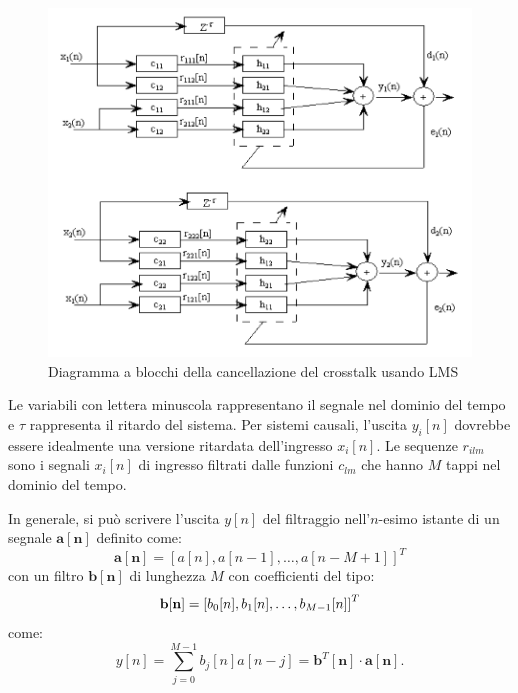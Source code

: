 \documentclass[12pt,a4paper,titlepage]{article}
\begin{document}
\begin{figure}[h]
	\centering	
	\includegraphics[width=\textwidth]{Immagini/lms.png}
	\caption{Diagramma a blocchi della cancellazione del crosstalk usando LMS}
	\label{fig:lms}
\end{figure}

Le variabili con lettera minuscola rappresentano il segnale nel dominio del tempo e $\tau$ rappresenta il ritardo del sistema. Per sistemi causali, l'uscita $y_i[n]$ dovrebbe essere idealmente una versione ritardata dell'ingresso $x_i[n]$. Le sequenze $r_{ilm}$ sono i segnali $x_i[n]$ di ingresso filtrati dalle funzioni $c_{lm}$ che hanno $M$ tappi nel dominio del tempo.

In generale, si può scrivere l'uscita $y[n]$ del filtraggio nell'$n$-esimo istante di un segnale $\mathbf{a[n]}$ definito come:
\begin{equation*}
\mathbf{a[n]} = \left[a[n], a[n-1], \dots, a[n - M + 1]\right]^T
\end{equation*}
con un filtro $\mathbf{b[n]}$ di lunghezza $M$ con coefficienti del tipo:
\begin{equation*}
\mathbf{b[n]} =  \left[b_{0}[n], b_{1}[n], \dots,\\ b_{M-1}[n]\right]^T
\end{equation*}
come:
\begin{equation}\label{eq:filtraggio_prodotto_scalare}
y[n] = \sum_{j=0}^{M-1}b_{j}[n]a[n-j] = \mathbf{b}^T[\mathbf{n}] \cdot \mathbf{a}[\mathbf{n}].
\end{equation}
\end{document}
